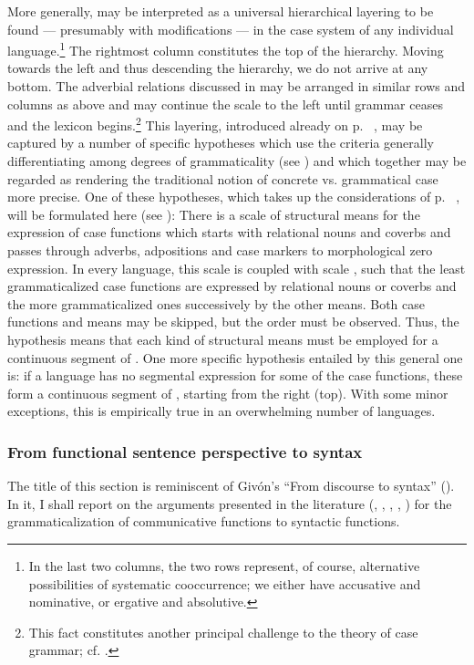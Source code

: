 \noindent\label{page120}More generally,  may be interpreted as a universal hierarchical layering to be found — presumably with modifications — in the case system of any individual language.\footnote{In the last two columns, the two rows represent, of course, alternative possibilities of systematic cooccurrence; we either have accusative and nominative, or ergative and absolutive.} The rightmost column constitutes the top of the hierarchy. Moving towards the left and thus descending the hierarchy, we do not arrive at any bottom. The adverbial relations discussed in  may be arranged in similar rows and columns as above and may continue the scale to the left until grammar ceases and the lexicon begins.\footnote{This fact constitutes another principal challenge to the theory of case grammar; cf. \citet[76f]{Dillon1977}.} This layering, introduced already on p.~\pageref{page102}\chk%
, may be captured by a number of specific hypotheses which use the criteria generally differentiating among degrees of grammaticality (see ) and which together may be regarded as rendering the traditional notion of concrete vs. grammatical case more precise. One of these hypotheses, which takes up the considerations of p.~\pageref{page102}\chk%
 , will be formulated here (see \citealt[§~4]{Lehmann1983}): There is a scale of structural means for the expression of case functions which starts with relational nouns and coverbs and passes through adverbs, adpositions and case markers to morphological zero expression. In every language, this scale is coupled with scale , such that the least grammaticalized case functions are expressed by relational nouns or coverbs and the more grammaticalized ones successively by the other means. Both case functions and means may be skipped, but the order must be observed. Thus, the hypothesis means that each kind of structural means must be employed for a continuous segment of . One more specific hypothesis entailed by this general one is: if a language has no segmental expression for some of the case functions, these form a continuous segment of , starting from the right (top). With some minor exceptions, this is empirically true in an overwhelming number of languages.

 
\subsubsection{From functional sentence perspective to syntax} \label{sec:3.4.2.3}
The title of this section is reminiscent of Givón's “From discourse to syntax” (\citeyear{Givón1979}). In it, I shall report on the arguments presented in the literature (\citealt{LiEtAl1976}, \citealt{Sankoff1977}, \citealt{Hagège1978}, \citealt{Givón1979}, \citealt{Vincent1980a}) for the grammaticalization of communicative functions to syntactic functions.

